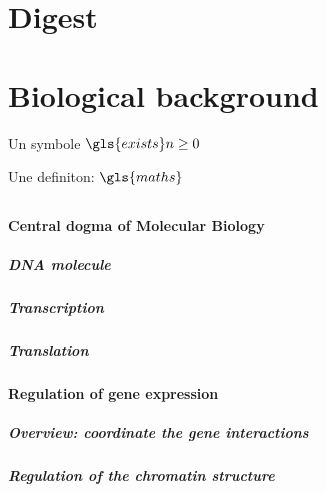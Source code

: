 \chapter*{Digest}



\chapter{Biological background}
Un symbole
$\gls{exists} n \ge 0$


Une definiton:
$\gls{maths}$


\section{}

\subsubsection{Central dogma of Molecular Biology}

\paragraph{DNA molecule}

\paragraph{Transcription}

\paragraph{Translation}

\subsubsection{Regulation of gene expression}
\paragraph{Overview: coordinate the gene interactions}

\paragraph{Regulation of the chromatin structure}

